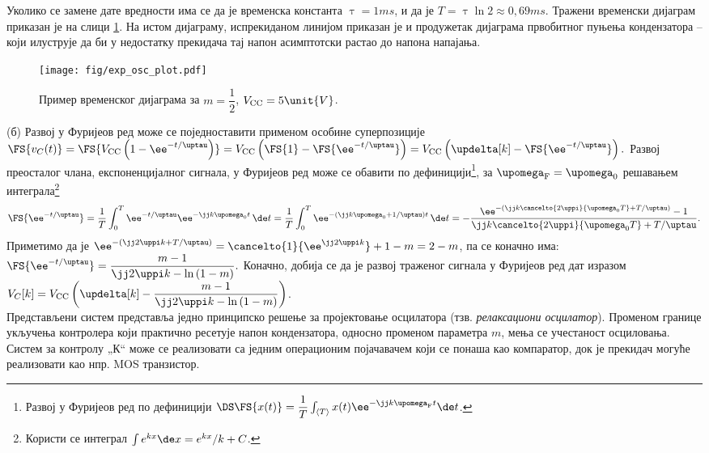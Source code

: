 Уколико се замене дате вредности има се да је временска константа 
$\uptau = 1\unit{ms}$, и да је $T = \uptau \ln 2 \approx 0,69 \unit{ms}$. 
Тражени временски дијаграм приказан је на слици \ref{fig:\ID.2}. На истом дијаграму, испрекиданом
линијом приказан је и продужетак дијаграма првобитног пуњења кондензатора -- који илуструје да би 
у недостатку прекидача тај напон асимптотски растао до напона напајања. 

\begin{figure}[ht!]
    \centering
    \texttt{[image: fig/exp\_osc\_plot.pdf]}
    \caption{Пример временског дијаграма за $m = \dfrac{1}{2}$, $V_{\rm CC} = 5\unit{V}$. }
    \label{fig:\ID.2}
\end{figure} 

(б) Развој у Фуријеов ред може се поједноставити применом особине суперпозиције
$\FS{ v_C(t) } = 
\FS{ V_{\rm CC} \left(
    1 - \ee^{-t/\uptau} \right) } 
= V_{\rm CC} \left(
    \FS{1}
    -
    \FS{
    \ee^{-t/\uptau}    
    }
\right) 
= V_{\rm CC} \left(
\updelta[k] 
-
\FS{
    \ee^{-t/\uptau}    
    }
\right).
$ 
Развој преосталог члана, експоненцијалног сигнала, у Фуријеов ред може се обавити по 
дефиницији\footnote{
    Развој у Фуријеов ред по дефиницији 
    $\DS\FS{x(t)} = \dfrac{1}{T}\int_{\langle T \rangle} x(t) \ee^{-\jj k \upomega_{\rm F} t} \de t$.
}, за $\upomega_{\rm F} = \upomega_0$
решавањем интеграла\footnote{Користи се интеграл 
    $\int e^{kx} \de x = e^{kx}/k + C$.
} 
\begin{equation}
    \FS{
    \ee^{-t/\uptau}    
    }
    = \dfrac{1}{T}\int_0^T 
    \ee^{-t/\uptau} \ee^{-\jj k \upomega_0 t} \,\de t
    =
    \dfrac{1}{T}\int_0^T 
    \ee^{-\left( \jj k\upomega_0  +  1/\uptau \right) t } \,\de t
    = 
    -\dfrac{
        \ee^{-\left( \jj k \cancelto{2\uppi}{\upomega_0 T}  +  T/\uptau \right) }
        - 1
    }{ \jj k \cancelto{ 2\uppi }{\upomega_0 T}  +  T/\uptau }.
\end{equation}
Приметимо да је 
$
\ee^{ -\left( \jj 2\uppi k  +  T/\uptau \right)} 
= \cancelto{1}{\ee^{\jj 2\uppi k}} + {1-m} = 2 - m$, па се коначно има: 
$
\FS{
    \ee^{-t/\uptau}    
    } =
    \dfrac{m - 1}{
        \jj 2\uppi k - \ln\left( 1 - m \right)
    }.
$ Коначно, добија се да је развој траженог сигнала у Фуријеов ред дат изразом
$V_C[k] = 
V_{\rm CC} \left(
    \updelta[k] 
        - 
        \dfrac{m - 1}{
            \jj 2\uppi k - \ln\left( 1 - m \right)
        }
\right)$. \\

Представљени систем представља једно принципско решење за пројектовање осцилатора 
(тзв. \textit{релаксациони осцилатор}). Променом границе укључења контролера који практично
ресетује напон кондензатора, односно променом 
параметра $m$,
мења се учестаност осциловања. Систем за контролу „К“ може се реализовати са једним операционим
појачавачем који се понаша као компаратор, док је прекидач могуће реализовати као нпр. MOS 
транзистор. 
